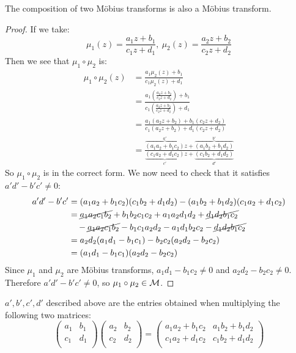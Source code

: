 \documentclass[../main.tex]{subfiles}
\begin{document}
\begin{proposition}
  The composition of two M\"obius transforms is also a M\"obius transform.
  \label{mobComposition}
\end{proposition}
\begin{proof}
  If we take:
  \[
    \mu_1(z) = \frac{a_1 z + b_1}{c_1 z + d_1},\
    \mu_2(z) = \frac{a_2 z + b_2}{c_2 z + d_2}
  \]
  Then we see that $\mu_1 \circ \mu_2$ is:
  \begin{align*}
    \mu_1 \circ \mu_2 (z) &= \frac{a_1\mu_2(z) + b_1}{c_1\mu_2(z) + d_1} \\
                          &= \frac{a_1\left(\frac{a_2 z + b_2}{c_2 z + d_2}\right) + b_1}{c_1\left(\frac{a_2 z + b_2}{c_2 z + d_2}\right) + d_1} \\
                          &= \frac{a_1(a_2 z + b_2) + b_1(c_2 z + d_2)}{c_1(a_2 z + b_2) + d_1(c_2 z + d_2)} \\
                          &= \frac{\overbrace{(a_1 a_2 + b_1 c_2)}^{a'}z + \overbrace{(a_1 b_2 + b_1 d_2)}^{b'}}{\underbrace{(c_1 a_2 + d_1 c_2)}_{c'}z + \underbrace{(c_1 b_2 + d_1 d_2)}_{d'}}
  \end{align*}
  So $\mu_1 \circ \mu_2$ is in the correct form.
  We now need to check that it satisfies $a'd' - b'c' \neq 0$:
  \begin{align*}
    a'd' - b'c' &= (a_1 a_2 + b_1 c_2)(c_1 b_2 + d_1 d_2) - (a_1 b_2 + b_1 d_2)(c_1 a_2 + d_1 c_2) \\
                &= \cancel{a_1 a_2 c_1 b_2} + b_1 b_2 c_1 c_2 + a_1 a_2 d_1 d_2 + \cancel{d_1 d_2 b_1 c_2}\\
                &\quad- \cancel{a_1 a_2 c_1 b_2} - b_1 c_1 a_2 d_2 - a_1 d_1 b_2 c_2 - \cancel{d_1 d_2 b_1 c_2} \\
                &= a_2 d_2(a_1 d_1 - b_1 c_1) - b_2 c_2(a_2 d_2 - b_2 c_2) \\
                &= (a_1 d_1 - b_1 c_1)(a_2 d_2 - b_2 c_2)
  \end{align*}
  Since $\mu_1$ and $\mu_2$ are M\"obius transforms, $a_1 d_1 - b_1 c_2 \neq 0$ and $a_2 d_2 - b_2 c_2 \neq 0$.
  Therefore $a'd' - b'c' \neq 0$, so $\mu_1 \circ \mu_2 \in \mathcal{M}$.
\end{proof}
\begin{remark}
  $a', b', c', d'$ described above are the entries obtained when multiplying the following two matrices:
  \[
    \begin{pmatrix}
    a_1 & b_1 \\
    c_1 & d_1 \\
    \end{pmatrix}
    \begin{pmatrix}
    a_2 & b_2 \\
    c_2 & d_2 \\
    \end{pmatrix} =
    \begin{pmatrix}
    a_1a_2 + b_1c_2 & a_1b_2 + b_1d_2 \\
    c_1a_2 + d_1c_2 & c_1b_2 + d_1d_2 \\
    \end{pmatrix}
  \]
\end{remark}
\end{document}
